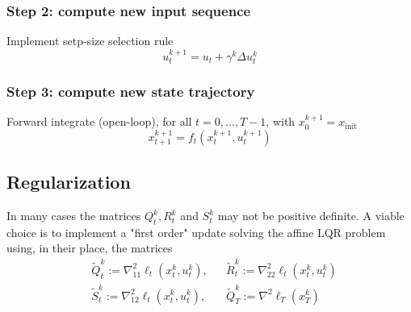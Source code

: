 \documentclass[openany]{book}
\theoremstyle{definition}
\theoremstyle{remark}
\begin{document}
\subsubsection{Step 2: compute new input sequence}
Implement setp-size selection rule 
\[
    u_t^{k+1} = u_t + \gamma^k\Delta u_t^k
\]
\subsubsection{Step 3: compute new state trajectory}
Forward integrate (open-loop), for all $t=0,\dots,T-1$, with $x_0^{k+1}=x_{\text{init}}$
\[
    x_{t+1}^{k+1} = f_t(x_{t}^{k+1},u_t^{k+1})
\]
\subsection{Regularization}
In many cases the matrices $Q_t^k,R_t^k$ and $S_t^k$ may not be positive definite. A viable choice is to implement a "first order" update solving the affine LQR problem using, in their place, the matrices 
\begin{align*}
    & \tilde{Q}_t^k := \nabla_{11}^2\ell_t(x_t^k,u_t^k), & & \tilde{R}_t^k := \nabla_{22}^2\ell_t(x_t^k,u_t^k)\\
    & \tilde{S}_t^k := \nabla_{12}^2\ell_t(x_t^k,u_t^k), & & \tilde{Q}_T^k := \nabla^2\ell_T(x_T^k)
\end{align*}
\end{document}
